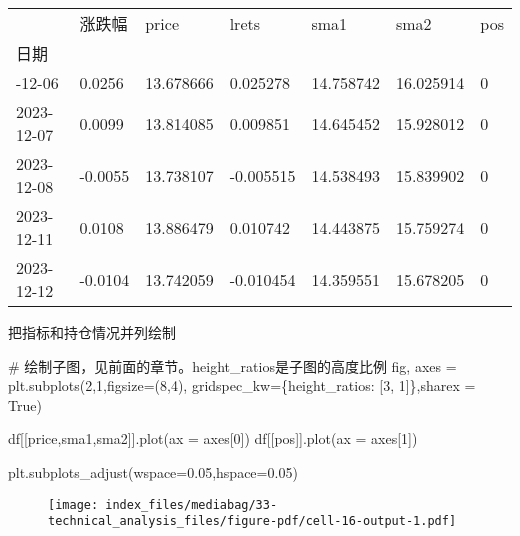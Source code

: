 \documentclass[
  letterpaper,
  DIV=11,
  numbers=noendperiod]{scrreprt}
\newenvironment{Shaded}{\begin{snugshade}}{\end{snugshade}}
\newcommand{\CommentTok}[1]{\textcolor[rgb]{0.37,0.37,0.37}{#1}}
\newcommand{\DecValTok}[1]{\textcolor[rgb]{0.68,0.00,0.00}{#1}}
\newcommand{\FloatTok}[1]{\textcolor[rgb]{0.68,0.00,0.00}{#1}}
\newcommand{\NormalTok}[1]{\textcolor[rgb]{0.00,0.23,0.31}{#1}}
\newcommand{\OperatorTok}[1]{\textcolor[rgb]{0.37,0.37,0.37}{#1}}
\newcommand{\StringTok}[1]{\textcolor[rgb]{0.13,0.47,0.30}{#1}}
\newcommand{\VariableTok}[1]{\textcolor[rgb]{0.07,0.07,0.07}{#1}}
\begin{document}
\begin{longtable}[]{@{}lllllll@{}}
\toprule\noalign{}
& 涨跌幅 & price & lrets & sma1 & sma2 & pos \\
日期 & & & & & & \\
\midrule\noalign{}
\endhead
\bottomrule\noalign{}
\endlastfoot
2023-12-06 & 0.0256 & 13.678666 & 0.025278 & 14.758742 & 16.025914 &
0 \\
2023-12-07 & 0.0099 & 13.814085 & 0.009851 & 14.645452 & 15.928012 &
0 \\
2023-12-08 & -0.0055 & 13.738107 & -0.005515 & 14.538493 & 15.839902 &
0 \\
2023-12-11 & 0.0108 & 13.886479 & 0.010742 & 14.443875 & 15.759274 &
0 \\
2023-12-12 & -0.0104 & 13.742059 & -0.010454 & 14.359551 & 15.678205 &
0 \\
\end{longtable}

把指标和持仓情况并列绘制

\begin{Shaded}
\begin{Highlighting}[]
\CommentTok{\# 绘制子图，见前面的章节。height\_ratios是子图的高度比例}
\NormalTok{fig, axes }\OperatorTok{=}\NormalTok{ plt.subplots(}\DecValTok{2}\NormalTok{,}\DecValTok{1}\NormalTok{,figsize}\OperatorTok{=}\NormalTok{(}\DecValTok{8}\NormalTok{,}\DecValTok{4}\NormalTok{), gridspec\_kw}\OperatorTok{=}\NormalTok{\{}\StringTok{\textquotesingle{}height\_ratios\textquotesingle{}}\NormalTok{: [}\DecValTok{3}\NormalTok{, }\DecValTok{1}\NormalTok{]\},sharex }\OperatorTok{=} \VariableTok{True}\NormalTok{)}

\NormalTok{df[[}\StringTok{\textquotesingle{}price\textquotesingle{}}\NormalTok{,}\StringTok{\textquotesingle{}sma1\textquotesingle{}}\NormalTok{,}\StringTok{\textquotesingle{}sma2\textquotesingle{}}\NormalTok{]].plot(ax }\OperatorTok{=}\NormalTok{ axes[}\DecValTok{0}\NormalTok{])}
\NormalTok{df[[}\StringTok{\textquotesingle{}pos\textquotesingle{}}\NormalTok{]].plot(ax }\OperatorTok{=}\NormalTok{ axes[}\DecValTok{1}\NormalTok{])}

\NormalTok{plt.subplots\_adjust(wspace}\OperatorTok{=}\FloatTok{0.05}\NormalTok{,hspace}\OperatorTok{=}\FloatTok{0.05}\NormalTok{)}
\end{Highlighting}
\end{Shaded}

\begin{figure}[H]

{\centering \texttt{[image: index\_files/mediabag/33-technical\_analysis\_files/figure-pdf/cell-16-output-1.pdf]}

}

\end{figure}
\end{document}
